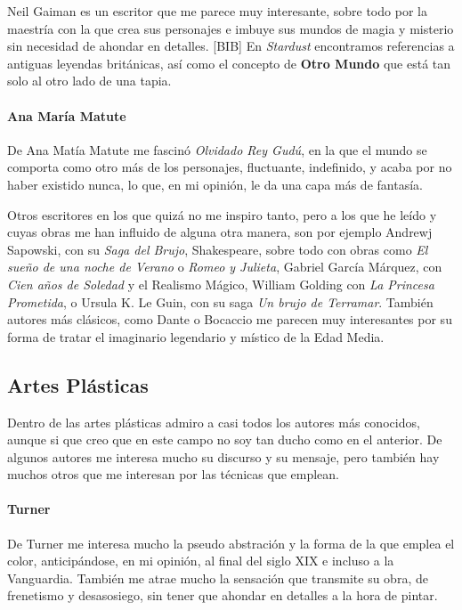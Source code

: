 Neil Gaiman es un escritor que me parece muy interesante, sobre todo por
la maestría con la que crea sus personajes e imbuye sus mundos de magia
y misterio sin necesidad de ahondar en detalles. {[}BIB{]} En
\emph{Stardust} encontramos referencias a antiguas leyendas británicas,
así como el concepto de \textbf{Otro Mundo} que está tan solo al otro
lado de una tapia.

\hypertarget{ana-maruxeda-matute}{%
\paragraph{Ana María Matute}\label{ana-maruxeda-matute}}

De Ana Matía Matute me fascinó \emph{Olvidado Rey Gudú}, en la que el
mundo se comporta como otro más de los personajes, fluctuante,
indefinido, y acaba por no haber existido nunca, lo que, en mi opinión,
le da una capa más de fantasía.

Otros escritores en los que quizá no me inspiro tanto, pero a los que he
leído y cuyas obras me han influido de alguna otra manera, son por
ejemplo Andrewj Sapowski, con su \emph{Saga del Brujo}, Shakespeare,
sobre todo con obras como \emph{El sueño de una noche de Verano} o
\emph{Romeo y Julieta}, Gabriel García Márquez, con \emph{Cien años de
Soledad} y el Realismo Mágico, William Golding con \emph{La Princesa
Prometida}, o Ursula K. Le Guin, con su saga \emph{Un brujo de
Terramar}. También autores más clásicos, como Dante o Bocaccio me
parecen muy interesantes por su forma de tratar el imaginario legendario
y místico de la Edad Media.

\hypertarget{artes-pluxe1sticas}{%
\subsection{Artes Plásticas}\label{artes-pluxe1sticas}}

Dentro de las artes plásticas admiro a casi todos los autores más
conocidos, aunque si que creo que en este campo no soy tan ducho como en
el anterior. De algunos autores me interesa mucho su discurso y su
mensaje, pero también hay muchos otros que me interesan por las técnicas
que emplean.

\hypertarget{turner}{%
\paragraph{Turner}\label{turner}}

De Turner me interesa mucho la pseudo abstración y la forma de la que
emplea el color, anticipándose, en mi opinión, al final del siglo XIX e
incluso a la Vanguardia. También me atrae mucho la sensación que
transmite su obra, de frenetismo y desasosiego, sin tener que ahondar en
detalles a la hora de pintar.

